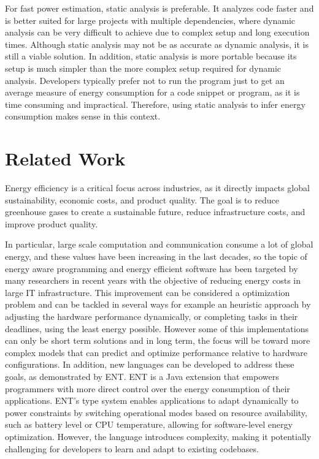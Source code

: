 \documentclass[sigplan]{acmart}
\begin{document}
For fast power estimation, static analysis is preferable. It analyzes code faster and is better suited for large projects with multiple dependencies, where dynamic analysis can be very difficult to achieve due to complex setup and long execution times. Although static analysis may not be as accurate as dynamic analysis, it is still a viable solution. In addition, static analysis is more portable because its setup is much simpler than the more complex setup required for dynamic analysis.
Developers typically prefer not to run the program just to get an average measure of energy consumption for a code snippet or program, as it is time consuming and impractical. Therefore, using static analysis to infer energy consumption makes sense in this context.


\section{Related Work} \label{sec:relatedwork}

Energy efficiency is a critical focus across industries, as it directly impacts global sustainability, economic costs, and product quality.  The goal is to reduce greenhouse gases to create a sustainable future, reduce infrastructure costs, and improve product quality\cite{annurev:/content/journals/10.1146/annurev.resource.102308.124234}. 

In particular, large scale computation and communication consume a lot of global energy, and these values have been increasing in the last decades, so the topic of energy aware programming and energy efficient software has been targeted by many researchers in recent years with the objective of reducing energy costs in large IT infrastructure. This improvement can be considered a optimization problem and can be tackled in several ways for example an heuristic approach by adjusting the hardware performance dynamically, or completing tasks in their deadlines, using the least energy possible. However some of this implementations can only be short term solutions and in long term, the focus will be toward more complex models that can predict and optimize performance relative to hardware configurations\cite{10.1145/1666420.1666438}.
In addition, new languages can be developed to address these goals, as demonstrated by ENT\cite{10.1145/3062341.3062356}. ENT is a Java extension that empowers programmers with more direct control over the energy consumption of their applications. ENT’s type system enables applications to adapt dynamically to power constraints by switching operational modes based on resource availability, such as battery level or CPU temperature, allowing for software-level energy optimization. However, the language introduces complexity, making it potentially challenging for developers to learn and adapt to existing codebases. 
\end{document}
